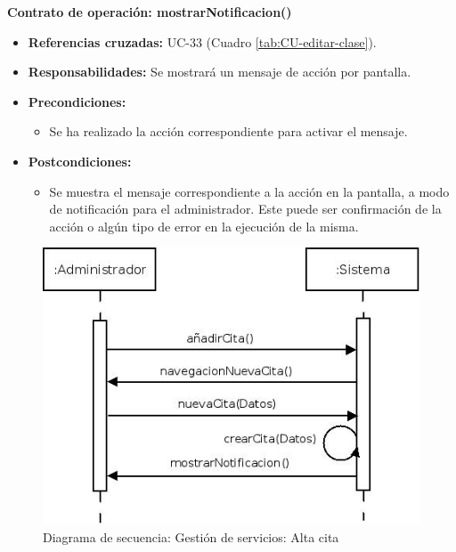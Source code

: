 \textbf{Contrato de operación: mostrarNotificacion()}
\begin{itemize}
\item \textbf{Referencias cruzadas:} UC-33 (Cuadro \ref{tab:CU-editar-clase}).
\item \textbf{Responsabilidades:} Se mostrará un mensaje de acción por pantalla.
\item \textbf{Precondiciones:} 
 \begin{itemize}
\item Se ha realizado la acción correspondiente para activar el mensaje.
\end {itemize}
\item \textbf{Postcondiciones:} 
 \begin{itemize}
\item Se muestra el mensaje correspondiente a la acción en la pantalla, a modo de notificación para el administrador. Este puede ser confirmación de la acción o algún tipo de error en la ejecución de la misma.
\end {itemize}
\end {itemize}


\vspace{10mm}

\begin{figure}[H]
\centering
  \includegraphics[scale=.55]{img/secuencias/gestion-servicios-alta-cita.jpeg}
  \caption{Diagrama de secuencia: Gestión de servicios: Alta cita}
  \label{fig:secuencia-gestion-servicios-alta-cita}
\end{figure}

